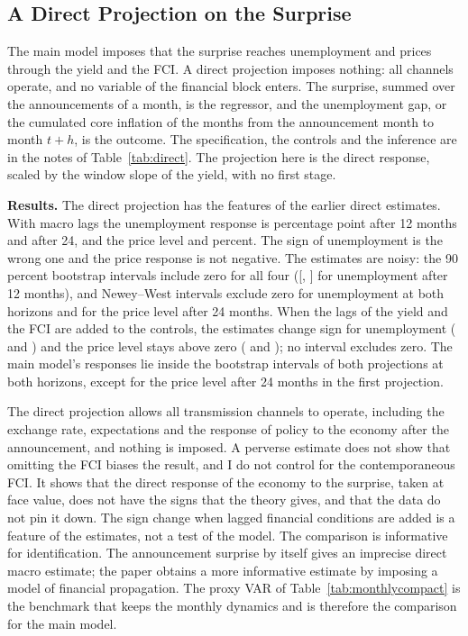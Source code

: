 \documentclass[11pt]{article}
\begin{document}
\begin{appendices}


\FloatBarrier
\section{A Direct Projection on the Surprise}\label{app:direct}
The main model imposes that the surprise reaches unemployment and prices through the yield and the FCI. A direct projection imposes nothing: all channels operate, and no variable of the financial block enters. The surprise, summed over the announcements of a month, is the regressor, and the unemployment gap, or the cumulated core inflation of the months from the announcement month to month $t+h$, is the outcome. The specification, the controls and the inference are in the notes of Table~\ref{tab:direct}. The projection here is the direct response, scaled by the window slope of the yield, with no first stage.

\textbf{Results.} The direct projection has the features of the earlier direct estimates. With macro lags the unemployment response is  percentage point after 12 months and  after 24, and the price level  and  percent. The sign of unemployment is the wrong one and the price response is not negative. The estimates are noisy: the 90 percent bootstrap intervals include zero for all four ([, ] for unemployment after 12 months), and Newey--West intervals exclude zero for unemployment at both horizons and for the price level after 24 months. When the lags of the yield and the FCI are added to the controls, the estimates change sign for unemployment ( and ) and the price level stays above zero ( and ); no interval excludes zero. The main model's responses lie inside the bootstrap intervals of both projections at both horizons, except for the price level after 24 months in the first projection.

The direct projection allows all transmission channels to operate, including the exchange rate, expectations and the response of policy to the economy after the announcement, and nothing is imposed. A perverse estimate does not show that omitting the FCI biases the result, and I do not control for the contemporaneous FCI. It shows that the direct response of the economy to the surprise, taken at face value, does not have the signs that the theory gives, and that the data do not pin it down. The sign change when lagged financial conditions are added is a feature of the estimates, not a test of the model. The comparison is informative for identification. The announcement surprise by itself gives an imprecise direct macro estimate; the paper obtains a more informative estimate by imposing a model of financial propagation. The proxy VAR of Table~\ref{tab:monthlycompact} is the benchmark that keeps the monthly dynamics and is therefore the comparison for the main model.


\end{appendices}
\end{document}
